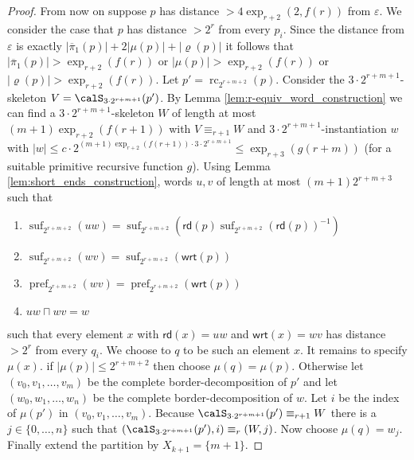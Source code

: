 \documentclass[a4paper,numberwithinsect,USenglish]{lipics-v2018}
\theoremstyle{plain}
\theoremstyle{remark}
\DeclareMathOperator{\pref}{pref}
\DeclareMathOperator{\suf}{suf}
\DeclareMathOperator{\cpr}{rc}
\newcommand{\ov}[1]{\overline{#1}}
\newcommand{\rd}[1]{\mathsf{rd}(#1)}
\newcommand{\wrt}[1]{\mathsf{wrt}(#1)}
\newcommand{\strt}[1]{\ov{\pi}_1(#1)}
\newcommand{\mddl}[1]{\mu(#1)}
\newcommand{\rght}[1]{\varrho(#1)}
\renewcommand{\epsilon}{\varepsilon}
\renewcommand{\Sigma}{\varSigma}
\begin{document}
\begin{proof}
	From now on suppose $p$ has distance $> 4\exp_{r+2}(2, f(r))$ from $\epsilon$.
	We consider the case that $p$ has distance $>2^r$ from every $p_i$.
	Since the distance from $\epsilon$ is exactly $|\strt{p}| + 2|\mddl{p}| + |\rght{p}|$ it follows that $|\strt{p}| > \exp_{r+2}(f(r))$ or $|\mddl{p}| > \exp_{r+2}(f(r))$ or $|\rght{p}| > \exp_{r+2}(f(r))$. 
	Let $p'= \cpr_{2^{r+m+2}}(p)$.  Consider 
	the $3\cdot 2^{r+m+1}$-skeleton $V = \calS_{3\cdot 2^{r+m+1}}(p')$. By Lemma \ref{lem:r-equiv_word_construction} we can find a $3\cdot 2^{r+m+1}$-skeleton $W$ of length at most $(m+1)\exp_{r+2}(f(r+1))$ with $V \equiv_{r+1} W$ and $3\cdot 2^{r+m+1}$-instantiation $w$ with $|w|\leq  c\cdot 2^{(m+1)\exp_{r+2}(f(r+1)) \cdot 3\cdot 2^{r+m+1}}  \leq \exp_{r+3}(g(r+m))$ (for a suitable primitive recursive function $g$). Using Lemma \ref{lem:short_ends_construction}, words $u,v$ of length at most 
	$(m+1)2^{r+m+3}$ such that 
	\begin{enumerate}
		\item $\suf_{2^{r+m+2}}(uw) = \suf_{2^{r+m+2}}(\rd{p}\suf_{2^{r+m+2}}(\rd{p})^{-1} )$
		\item $\suf_{2^{r+m+2}}(wv) = \suf_{2^{r+m+2}}(\wrt{p})$
		\item $\pref_{2^{r+m+2}}(wv) = \pref_{2^{r+m+2}}(\wrt{p})$
		\item $uw\sqcap wv = w$
	\end{enumerate}
	such that every element $x$ with $\rd{x} = uw$ and $\wrt{x} = wv$ has distance $> 2^r$ from every $q_i$.
	We choose to $q$ to be such an element $x$. It remains to specify $\mddl{x}$. if $|\mddl{p}| \leq 2^{r+m+2}$ then choose $\mu(q) = \mu(p)$. Otherwise
	let $(v_0,v_1,\ldots, v_m)$ be the complete border-decomposition of $p'$ and let $(w_0, w_1,\ldots, w_n)$ be the complete border-decomposition of $w$. Let $i$
	be the index of $\mddl{p'}$ in $(v_0,v_1,\ldots, v_m)$. Because $\calS_{3\cdot 2^{r+m+1}}(p') \equiv_{r+1} W$ there is a $j\in \{0,\ldots,n\}$ such that $(\calS_{3\cdot 2^{r+m+1}}(p'), i) \equiv_r (W,j)$.
	Now choose $\mu(q) = w_j$. Finally extend the partition by $X_{k+1} = \{m+1\}$.
	

\end{proof}
\end{document}
